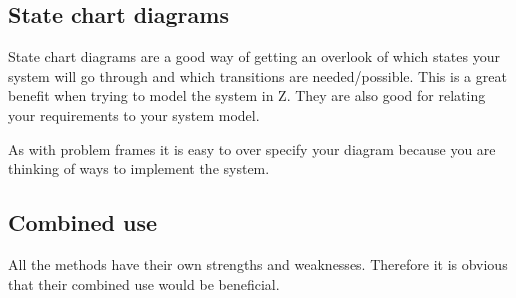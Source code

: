 \documentclass[Main_Assignment2]{subfiles}
\begin{document}
	
	\subsection{State chart diagrams} %
	\label{sub:state_chart_diagrams}

	State chart diagrams are a good way of getting an overlook of which states your system will go through and which transitions are needed/possible.
	This is a great benefit when trying to model the system in Z.
	They are also good for relating your requirements to your system model.

	As with problem frames it is easy to over specify your diagram because you are thinking of ways to implement the system.


	\subsection{Combined use} %
	\label{sub:combined_use}
	All the methods have their own strengths and weaknesses.
	Therefore it is obvious that their combined use would be beneficial.


\end{document}
